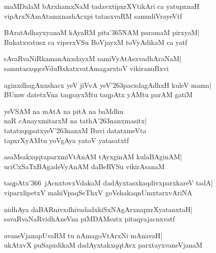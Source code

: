 \documentclass[twoside,12pt,openright]{book}
\def\S{\char'263}
\newcounter{shloka}[chapter]
\begin{document}
\begin{shloka}%
maMDalaM bArxhamxNaM tadavxtipxrXVtikAri ca yatupxnaH\\
vipArxNAmAtamxnashAcxpi tatasxvaRM samudiVrayeVtf
\end{shloka}

\begin{shloka}%
BAratAdhayxyanaM kAyaRM pita\char'365NAM paramaM pirxyaM|\\
Bukatxvatusx ca viperxVSu BoVjayxM toVyAdikaM ca yatf
\end{shloka}

\begin{shloka}%
sAvaRvaNiRkamanAnxdayxM samiVyAtAsxvadhAraNaM|\\
samutasxqqceVduBxkatxvatAmagarxtoV vikiranuBxvi
\end{shloka}

\begin{shloka}%
aginxdhagAnxshacx yeV jiVvA yeV\S pacxdagAdhxH kuleV mama|\\
BUmw datetxVna taqpayxMtu taqpAtx yAMtu parAM gatiM
\end{shloka}

\begin{shloka}%
yeVSAM na mAtA na pitA na baMdhu\\
naR cAnayxmitarxM na tathA\S nanxmasitx|\\
tatatxqqpatxyeV\S nanxM Buvi datatxmeVta\\
tapxrXyAMtu yoVgAya yatoV yatasatxtf
\end{shloka}

\begin{shloka}%
asaMsakxqqtaparxmiVtAnAM tAyxginAM kulaBAginAM|\\
uciCxSaTxBAgadeVyAnAM daBeRVSu vikirAsanaM
\end{shloka}

\begin{shloka}%
taqpAtx\char'366\ jAcnxtovxVdakaM dadAyxtasxkaqdivxparxkareV tadA|\\
viparxlipetxV mahiVpaqSeThxV goVshakaqnUmxtarxvAriNA
\end{shloka}

\begin{shloka}%
nidhAya daBARnivxdhivadadxkiSxNAgArxnapxrXyatanxtaH|\\
savaRvaNaRvidhAneVna piMDAMsutx pitaqyajacnxvatf
\end{shloka}

\begin{shloka}%
avaneVjanapUvaRM tu nAmagoVtArxNi mAnavaH|\\
ukAtxvX puSapxdikaM dadAyxtakxqqtAvx parxtayxvaneVjanaM
\end{shloka}
\end{document}
